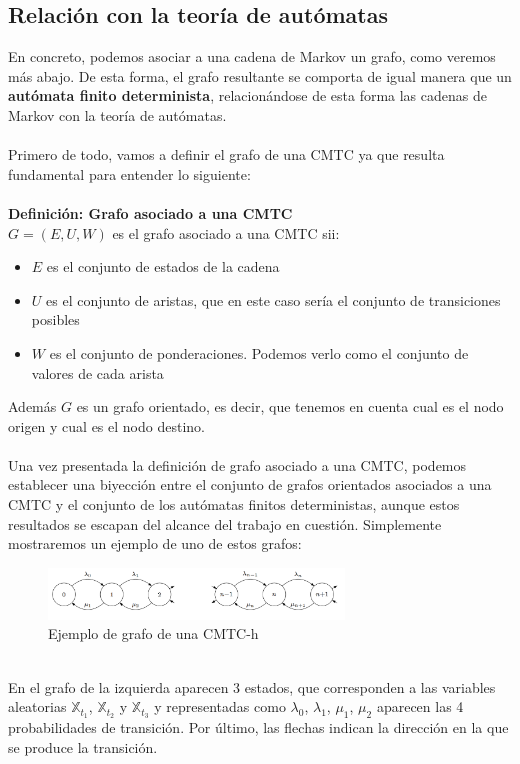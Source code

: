 \documentclass[12pt,a4paper]{article}
\begin{document}
\subsection{Relación con la teoría de autómatas}
En concreto, podemos asociar a una cadena de Markov un grafo, como veremos más abajo. De esta forma, el grafo resultante se comporta de igual manera que un \textbf{autómata finito determinista}, relacionándose de esta forma las cadenas de Markov con la teoría de autómatas.
\\\\
Primero de todo, vamos a definir el grafo de una CMTC ya que resulta fundamental para entender lo siguiente:
\\\\
\textbf{Definición: Grafo asociado a una CMTC}
\\
$G=(E,U,W)$ es el grafo asociado a una CMTC sii:
\begin{itemize}
\item $E$ es el conjunto de estados de la cadena
\item $U$ es el conjunto de aristas, que en este caso sería el conjunto de transiciones posibles
\item $W$ es el conjunto de ponderaciones. Podemos verlo como el conjunto de valores de cada arista
\end{itemize}
Además $G$ es un grafo orientado, es decir, que tenemos en cuenta cual es el nodo origen y cual es el nodo destino.
\\\\
Una vez presentada la definición de grafo asociado a una CMTC, podemos establecer una biyección entre el conjunto de grafos orientados asociados a una CMTC y el conjunto de los autómatas finitos deterministas, aunque estos resultados se escapan del alcance del trabajo en cuestión. Simplemente mostraremos un ejemplo de uno de estos grafos:
\\
\begin{figure}[h]
  \centering
    \includegraphics[width=0.7\textwidth]{img/grafo.png}
  \caption{Ejemplo de grafo de una CMTC-h}
  \label{fig:ejemplo}
\end{figure}
\\
En el grafo de la izquierda aparecen 3 estados, que corresponden a las variables aleatorias $\mathbb{X}_{t_1}$, $\mathbb{X}_{t_2}$ y $\mathbb{X}_{t_3}$ y representadas como $\lambda_0$, $\lambda_1$, $\mu_1$, $\mu_2$ aparecen las 4 probabilidades de transición. Por último, las flechas indican la dirección en la que se produce la transición.
\end{document}
